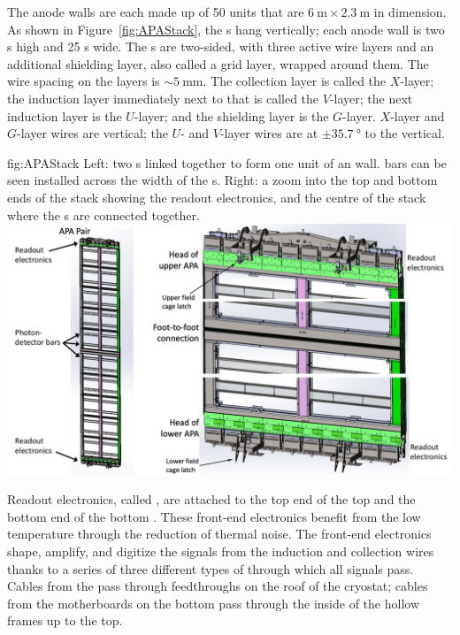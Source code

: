 The anode walls are each made up of 50  units that are $\SI{6}{\meter}\times\SI{2.3}{\meter}$ in dimension. As shown in Figure~\ref{fig:APAStack}, the s hang vertically; each anode wall is two s high and 25 s wide. The s are two-sided, with three active wire layers and an additional shielding layer, also called a grid layer, wrapped around them. The wire spacing on the layers is $\sim\!\SI{5}{\mm}$. The collection layer is called the $X$-layer; the induction layer immediately next to that is called the $V$-layer; the next induction layer is the $U$-layer; and the shielding layer is the $G$-layer. $X$-layer and $G$-layer wires are vertical; the $U$- and $V$-layer wires are at $\pm\SI{35.7}{\degree}$ to the vertical.

\begin{dunefigure}{fig:APAStack}
{Left: two s linked together to form one unit of an  wall.  bars can be seen installed across the width of the s. Right: a zoom into the top and bottom ends of the  stack showing the readout electronics, and the centre of the stack where the s are connected together.}
\includegraphics[width=\textwidth]{graphics/APAStack.pdf}
\end{dunefigure}

Readout electronics, called , are attached to the top end of the top  and the bottom end of the bottom . These front-end electronics benefit from the low  temperature through the reduction of thermal noise. The front-end electronics shape, amplify, and digitize the signals from the induction and collection wires thanks to a series of three different types of  through which all signals pass.
Cables from the  pass through feedthroughs on the roof of the cryostat; cables from the motherboards on the bottom  pass through the inside of the hollow  frames up to the top.

